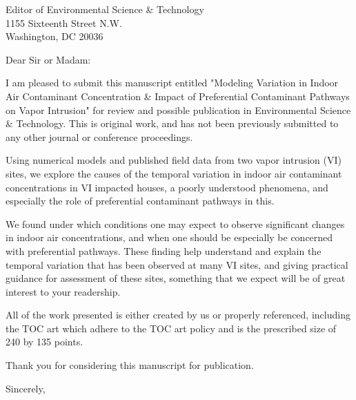 \documentclass{letter}
\begin{document}
\begin{letter}{Editor of Environmental Science \& Technology \\
1155 Sixteenth Street N.W. \\
Washington, DC 20036}
\opening{Dear Sir or Madam:}

I am pleased to submit this manuscript entitled "Modeling Variation in Indoor Air Contaminant Concentration \& Impact of Preferential Contaminant Pathways on Vapor Intrusion" for review and possible publication in Environmental Science \& Technology.
This is original work, and has not been previously submitted to any other journal or conference proceedings.

Using numerical models and published field data from two vapor intrusion (VI) sites, we explore the causes of the temporal variation in indoor air contaminant concentrations in VI impacted houses, a poorly understood phenomena, and especially the role of preferential contaminant pathways in this.

We found under which conditions one may expect to observe significant changes in indoor air concentrations, and when one should be especially be concerned with preferential pathways.
These finding help understand and explain the temporal variation that has been observed at many VI sites, and giving practical guidance for assessment of these sites, something that we expect will be of great interest to your readership.

All of the work presented is either created by us or properly referenced, including the TOC art which adhere to the TOC art policy and is the prescribed size of 240 by 135 points.

Thank you for considering this manuscript for publication.
\closing{Sincerely,}

\end{letter}
\end{document}
